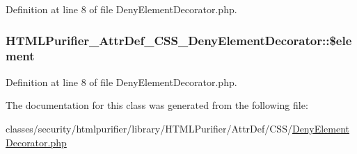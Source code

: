 Definition at line 8 of file Deny\+Element\+Decorator.\+php.

\hypertarget{classHTMLPurifier__AttrDef__CSS__DenyElementDecorator_a83ed8157a77ab74cbe87f6c882f2af2d}{
\subsubsection[{\$element}]{\setlength{\rightskip}{0pt plus 5cm}H\+T\+M\+L\+Purifier\+\_\+\+Attr\+Def\+\_\+\+C\+S\+S\+\_\+\+Deny\+Element\+Decorator\+::\$element}}\label{classHTMLPurifier__AttrDef__CSS__DenyElementDecorator_a83ed8157a77ab74cbe87f6c882f2af2d}


Definition at line 8 of file Deny\+Element\+Decorator.\+php.



The documentation for this class was generated from the following file\+:\begin{DoxyCompactItemize}
\item 
classes/security/htmlpurifier/library/\+H\+T\+M\+L\+Purifier/\+Attr\+Def/\+C\+S\+S/\hyperlink{DenyElementDecorator_8php}{Deny\+Element\+Decorator.\+php}\end{DoxyCompactItemize}
